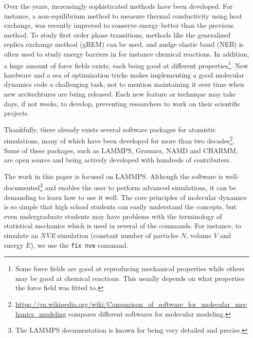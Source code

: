 \documentclass[aps,pre,twocolumn,letterpaper,floatfix,nofootinbib]{revtex4}
\newcommand{\code}[1]{\colorbox{light-gray}{\color{RawSienna}\texttt{#1}}}
\begin{document}
Over the years, increasingly sophisticated methods have been developed.
For instance, a non-equilibrium method to measure thermal conductivity using heat exchange, was recently improved\citep{wirnsberger2015enhanced} to conserve energy better than the previous method\citep{ikeshoji1994non}.
To study first order phase transitions, methods like the generalized replica exchange method (gREM)\citep{kim2010generalized} can be used, and nudge elastic band (NEB)\citep{henkelman2000climbing, henkelman2000improved} is often used to study energy barriers in for instance chemical reactions.
In addition, a huge amount of force fields exists, each being good at different properties\footnote{Some force fields are good at reproducing mechanical properties while others may be good at chemical reactions. This usually depends on what properties the force field was fitted to.}.
New hardware and a sea of optimization tricks makes implementing a good molecular dynamics code a challenging task, not to mention maintaining it over time when new arcitechtures are being released.
Each new feature or technique may take days, if not weeks, to develop, preventing researchers to work on their scientific projects.

Thankfully, there already exists several software packages for atomistic simulations, many of which have been developed for more than two decades\footnote{\url{https://en.wikipedia.org/wiki/Comparison_of_software_for_molecular_mechanics_modeling} compares different softwares for molecular modeling.}.
Some of these packages, such as LAMMPS\citep{Plimpton1995Fast}, Gromacs\citep{berendsen1995gromacs}, NAMD\citep{Phillips2005Scalable} and CHARMM\citep{brooks2009charmm}, are open source and being actively developed with hundreds of contributers.



The work in this paper is focused on LAMMPS.
Although the software is well-documented\footnote{The LAMMPS documentation is known for being very detailed and precise.} and enables the user to perform advanced simulations, it can be demanding to learn how to use it well.
The core principles of molecular dynamics is so simple that high school students can easily understand the concepts, but even undergraduate students may have problems with the terminology of statistical mechanics which is used in several of the commands.
For instance, to simulate an \textit{NVE} simulation (constant number of particles $N$, volume $V$ and energy $E$), we use the \code{fix nve} command.
\end{document}
